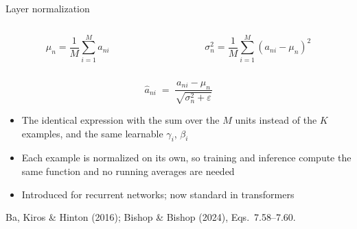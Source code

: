 \documentclass[aspectratio=169, 11pt]{beamer}
\newcommand{\srcline}[1]{%
  \par\vspace{0.25em}%
  {\scriptsize\color{mcMuted}\hfill #1\par}}
\newcommand{\src}[3]{}      %
\begin{document}
\begin{frame}{Layer normalization}
  \src{bishop2024}{equation}{7.58-7.60}
  \src{bishop2024}{section}{7.4.3}
  \src{ba2016}{equation}{3}
  \src{ba2016}{section}{3}
  \vspace{-0.55em}
  \begin{columns}[T, onlytextwidth]
    \begin{column}{0.47\textwidth}
      \[ \mu_n = \frac{1}{M}\sum_{i=1}^{M} a_{ni} \]
    \end{column}
    \begin{column}{0.50\textwidth}
      \[ \sigma_n^2 = \frac{1}{M}\sum_{i=1}^{M}(a_{ni} - \mu_n)^2 \]
    \end{column}
  \end{columns}
  \vspace{-0.6em}
  \[
    \hat{a}_{ni} \;=\; \frac{a_{ni} - \mu_n}{\sqrt{\sigma_n^2 +
      \varepsilon}}
  \]
  \vspace{-0.7em}
  \begin{itemize}\itemsep0.28em
    \item The identical expression with the sum over the $M$
          \alert{units} instead of the $K$ examples, and the same
          learnable $\gamma_i$, $\beta_i$
    \item Each example is normalized on its own, so training and
          inference compute the \alert{same} function and no running
          averages are needed
    \item Introduced for recurrent networks; now standard in
          transformers
  \end{itemize}
  \srcline{Ba, Kiros \& Hinton (2016); Bishop \& Bishop (2024),
  Eqs.~7.58--7.60.}
\end{frame}
\end{document}

